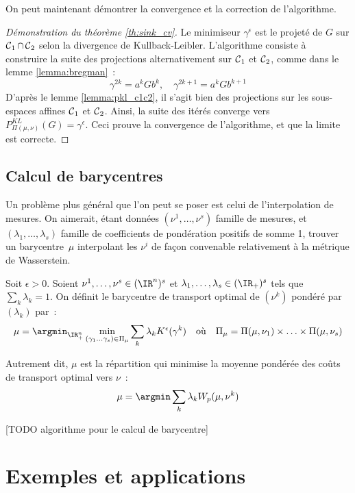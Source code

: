 On peut maintenant démontrer la convergence et la correction de l'algorithme.
\begin{proof}[Démonstration du théorème \ref{th:sink_cv}]
Le minimiseur $\gamma^\epsilon$ est le projeté de $G$ sur $\operatorname{\mathcal{C}}_1 \cap \operatorname{\mathcal{C}}_2$ selon la divergence de Kullback-Leibler. L'algorithme consiste à construire la suite des projections alternativement sur $\operatorname{\mathcal{C}}_1$ et $\operatorname{\mathcal{C}}_2$, comme dans le lemme \ref{lemma:bregman}~:
\[\gamma^{2k} = a^k G b^k,\quad \gamma^{2k+1} = a^k G b^{k+1}\]
D'après le lemme \ref{lemma:pkl_c1c2}, il s'agit bien des projections sur les sous-espaces affines $\operatorname{\mathcal{C}}_1$ et $\operatorname{\mathcal{C}}_2$.
 Ainsi, la suite des itérés converge vers $P^{KL}_{\Pi(\mu,\nu)}(G) = \gamma^\epsilon$. Ceci prouve la convergence de l'algorithme, et que la limite est correcte.
\end{proof}

\subsection{Calcul de barycentres}
Un problème plus général que l'on peut se poser est celui de l'interpolation de mesures. On aimerait, étant données $(\nu^1, \ldots, \nu^s)$ famille de mesures, et $(\lambda_1, \ldots, \lambda_s)$ famille de coefficients de pondération positifs de somme 1, trouver un \og barycentre \fg $\,\mu$ interpolant les $\nu^i$ de façon convenable relativement à la métrique de Wasserstein.

\begin{definition}
Soit $\epsilon > 0$. Soient $\nu^1, \ldots, \nu^s \in (\IR^{n})^s$ et $\lambda_1, \ldots, \lambda_s \in (\IR_+)^s$ tels que $\sum_k \lambda_k = 1$. On définit le barycentre de transport optimal de $(\nu^k)$ pondéré par $(\lambda_k)$ par~:
\[
\mu = \argmin_{\IR_{+}^{n}} \min_{(\gamma_1 \ldots \gamma_s) \in \Pi_\mu} \sum_k \lambda_k K^\epsilon(\gamma^k) 
\quad \text{où} \quad
\Pi_\mu = \Pi(\mu,\nu_1) \times \ldots \times \Pi(\mu,\nu_s)
\]
\end{definition}
Autrement dit, $\mu$ est la répartition qui minimise la moyenne pondérée des coûts de transport optimal vers $\nu$~:
\[ \mu = \argmin \sum_k \lambda_k W_p(\mu,\nu^k) \]

[TODO algorithme pour le calcul de barycentre]

\section{Exemples et applications}

